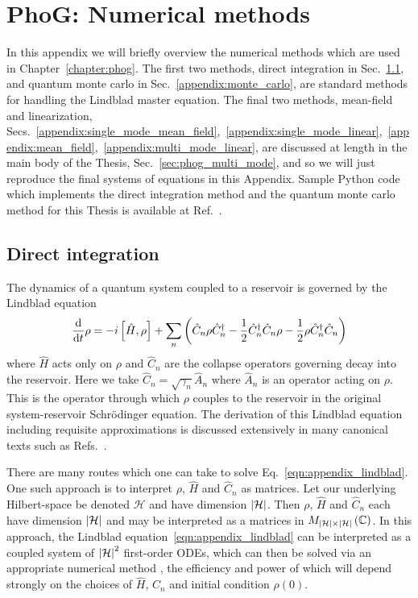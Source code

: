 \chapter{PhoG: Numerical methods}\label{appendix:phog_numerical_methods}

In this appendix we will briefly overview the numerical methods which are used in Chapter~\ref{chapter:phog}. The first two methods, direct integration in Sec.~\ref{appendix:direct_integration}, and quantum monte carlo in Sec.~\ref{appendix:monte_carlo}, are standard methods for handling the Lindblad master equation. %
The final two methods, mean-field and linearization, Secs.~\ref{appendix:single_mode_mean_field},~\ref{appendix:single_mode_linear},~\ref{appendix:mean_field},~\ref{appendix:multi_mode_linear}, are discussed at length in the main body of the Thesis, Sec.~\ref{sec:phog_multi_mode}, and so we will just reproduce the final systems of equations in this Appendix. Sample Python code which implements the direct integration method and the quantum monte carlo method for this Thesis is available at Ref.~\cite{deposited_code}.

\section{Direct integration}\label{appendix:direct_integration}

The dynamics of a quantum system coupled to a reservoir is governed by the Lindblad equation
\begin{equation}\label{eqn:appendix_lindblad}
\frac{\mathrm{d}}{\mathrm{d}t} \rho = - i \left[ \hat{H}, \rho \right] + \sum_n \left(\hat{C}_n \rho \hat{C}_n^\dagger - \frac{1}{2} \hat{C}_n^\dagger \hat{C}_n \rho - \frac{1}{2} \rho \hat{C}_n^\dagger \hat{C}_n \right)
\end{equation}
where $\hat{H}$ acts only on $\rho$ and $\hat{C}_n$ are the collapse operators governing decay into the reservoir. Here we take $\hat{C}_n = \sqrt{\gamma_n} \hat{A}_n$ where $\hat{A}_n$ is an operator acting on $\rho$. This is the operator through which $\rho$ couples to the reservoir in the original system-reservoir Schr{\"o}dinger equation. The derivation of this Lindblad equation including requisite approximations is discussed extensively in many canonical texts such as Refs.~\cite{Breuer2002, Carmichael1999}. 

There are many routes which one can take to solve Eq.~\ref{eqn:appendix_lindblad}. One such approach is to interpret $\rho$, $\hat{H}$ and $\hat{C}_n$ as matrices. Let our underlying Hilbert-space be denoted $\mathcal{H}$ and have dimension $\left|\mathcal{H}\right|$. Then $\rho$, $\hat{H}$ and $\hat{C}_n$ each have dimension $\left|\mathcal{H}\right|$ and may be interpreted as a matrices in $M_{\left|\mathcal{H}\right| \times \left|\mathcal{H}\right|}\left(\mathbb{C}\right)$. In this approach, the Lindblad equation~\ref{eqn:appendix_lindblad} can be interpreted as a coupled system of $\left|\mathcal{H}\right|^2$ first-order ODEs, which can then be solved via an appropriate numerical method \cite{Corless2013}, the efficiency and power of which will depend strongly on the choices of $\hat{H}$, $\hat{C}_n$ and initial condition $\rho\left(0\right)$.

